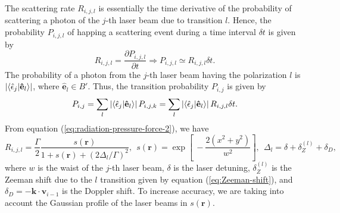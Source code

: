 The scattering rate $ R_{i,j,l} $ is essentially the time derivative of the probability of scattering a photon of the $j$-th laser beam due to transition $ l $. Hence, the probability $ P_{i,j,l} $ of happing a scattering event during a time interval $ \delta t $ is given by
\begin{equation}
    R_{i,j,l} = \frac{\partial P_{i,j,l}}{\partial t} \Rightarrow P_{i,j,l} \simeq R_{i,j,l} \delta t.
\end{equation}
The probability of a photon from the $j$-th laser beam having the polarization $ l $ is $ \left| \braket{\hat{\epsilon}_j|\mathbf{\hat{e}}_l} \right| $, where $ \mathbf{\hat{e}}_l \in B' $. Thus, the transition probability $ P_{i,j} $ is given by
\begin{equation}
    P_{i,j} = \sum_{l} \left| \braket{\hat{\epsilon}_j|\mathbf{\hat{e}}_l} \right| P_{i,j,k} =  \sum_{l} \left| \braket{\hat{\epsilon}_j|\mathbf{\hat{e}}_l} \right| R_{i,j,l} \delta t.
\end{equation}
From equation (\ref{eq:radiation-pressure-force-2}), we have
\begin{equation}
    R_{i,j,l} = \frac{\Gamma}{2}\frac{s(\mathbf{r})}{1 + s(\mathbf{r}) + (2\Delta_l / \Gamma)^2},\ \ s(\mathbf{r}) = \exp\left[\ -\frac{2(x^2 + y^2)}{w^2} \right],\ \ \Delta_l = \delta + \delta_Z^{(l)} + \delta_D,
\end{equation}
where $ w $ is the waist of the $ j $-th laser beam, $ \delta $ is the laser detuning, $ \delta_Z^{(l)} $ is the Zeeman shift due to the $ l $ transition given by equation (\ref{eq:Zeeman-shift}), and $ \delta_D = - \mathbf{k} \cdot \mathbf{v}_{i - 1} $ is the Doppler shift. To increase accuracy, we are taking into account the Gaussian profile of the laser beams in $ s(\mathbf{r}) $.
